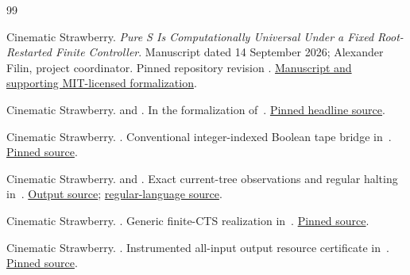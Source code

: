 \begin{thebibliography}{99}
\raggedright
{}
Cinematic Strawberry. \emph{Pure S Is Computationally Universal Under a Fixed
Root-Restarted Finite Controller}. Manuscript dated 14 September 2026;
Alexander Filin, project coordinator. Pinned repository revision
.
\href{https://github.com/cstrawberry/predictive-universe/blob/85a867988442fc423279341200f81634a1e65582/docs/paper/related/pure_s_universality/paper.md}{Manuscript and supporting MIT-licensed formalization}.

Cinematic Strawberry.  and
. In the formalization of~\cite{strawberry}.
\href{https://github.com/cstrawberry/predictive-universe/blob/85a867988442fc423279341200f81634a1e65582/docs/paper/related/pure_s_universality/formalization/PureSFormal/RootResetHeadline.lean}{Pinned headline source}.

Cinematic Strawberry. .
Conventional integer-indexed Boolean tape bridge in~\cite{strawberry}.
\href{https://github.com/cstrawberry/predictive-universe/blob/85a867988442fc423279341200f81634a1e65582/docs/paper/related/pure_s_universality/formalization/PureSFormal/Computation/DeterministicTapeInfiniteTape.lean}{Pinned source}.

Cinematic Strawberry.  and
. Exact current-tree observations and
regular halting in~\cite{strawberry}.
\href{https://github.com/cstrawberry/predictive-universe/blob/85a867988442fc423279341200f81634a1e65582/docs/paper/related/pure_s_universality/formalization/PureSFormal/Computation/DeterministicTapeRootResetOutput.lean}{Output source};
\href{https://github.com/cstrawberry/predictive-universe/blob/85a867988442fc423279341200f81634a1e65582/docs/paper/related/pure_s_universality/formalization/PureSFormal/Research/RootResetRegularMarkerLanguage.lean}{regular-language source}.

Cinematic Strawberry. .
Generic finite-CTS realization in~\cite{strawberry}.
\href{https://github.com/cstrawberry/predictive-universe/blob/85a867988442fc423279341200f81634a1e65582/docs/paper/related/pure_s_universality/formalization/PureSFormal/Research/RootResetFiniteAllInputsTraceAgreement.lean}{Pinned source}.

Cinematic Strawberry. .
Instrumented all-input output resource certificate in~\cite{strawberry}.
\href{https://github.com/cstrawberry/predictive-universe/blob/85a867988442fc423279341200f81634a1e65582/docs/paper/related/pure_s_universality/formalization/PureSFormal/Computation/DeterministicTapeOutputQuartic.lean}{Pinned source}.


\end{thebibliography}
